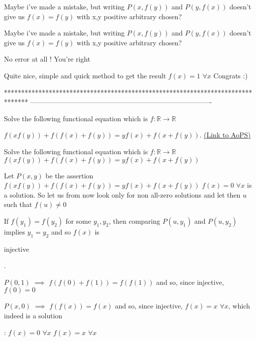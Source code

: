 \begin{solution}
	Maybe i've made a mistake, but writing $P(x,f(y))$ and $P(y,f(x))$ doesn't give us $f(x)=f(y)$ with x,y positive arbitrary chosen?
\end{solution}



\begin{solution}
	\begin{tcolorbox}Maybe i've made a mistake, but writing $P(x,f(y))$ and $P(y,f(x))$ doesn't give us $f(x)=f(y)$ with x,y positive arbitrary chosen?\end{tcolorbox}
No error at all ! You're right

Quite nice, simple and quick method to get the result $f(x)=1$ $\forall x$
Congrats :)
\end{solution}
*******************************************************************************
-------------------------------------------------------------------------------

\begin{problem}
	Solve the following functional equation which is $f:\mathbb R\to\mathbb R$

$f\left(xf\left(y\right)\right) + f\left(f\left(x\right)+f\left(y\right)\right) = yf\left(x\right) + f\left(x+f\left(y\right)\right)$.
	\flushright \href{https://artofproblemsolving.com/community/c6h471789}{(Link to AoPS)}
\end{problem}



\begin{solution}
	\begin{tcolorbox}Solve the following functional equation which is $f:\mathbb R\to\mathbb R$
$f(xf(y))+f(f(x)+f(y))=yf(x)+f(x+f(y))$\end{tcolorbox}
Let $P(x,y)$ be the assertion $f(xf(y))+f(f(x)+f(y))=yf(x)+f(x+f(y))$
$f(x)=0$ $\forall x$ is a solution. So let us from now look only for non all-zero solutions and let then $u$ such that $f(u)\ne 0$

If $f(y_1)=f(y_2)$ for some $y_1,y_2$, then comparing $P(u,y_1)$ and $P(u,y_2)$ implies $y_1=y_2$ and so $f(x)$ is \begin{bolded}injective\end{bolded}.

$P(0,1)$ $\implies$ $f(f(0)+f(1))=f(f(1))$ and so, since injective, $f(0)=0$

$P(x,0)$ $\implies$ $f(f(x))=f(x)$ and so, since injective, $f(x)=x$ $\forall x$, which indeed is a solution

 :
$f(x)=0$ $\forall x$
$f(x)=x$ $\forall x$
\end{solution}



